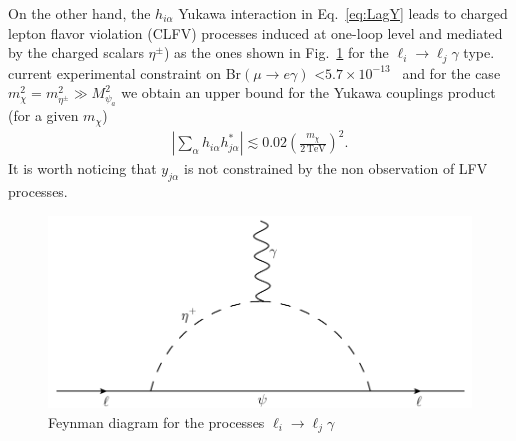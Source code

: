 \documentclass[12pt]{article}
\begin{document}
On the other hand, the $h_{i\alpha}$ Yukawa interaction in Eq.~\eqref{eq:LagY} leads to charged lepton flavor violation (CLFV) processes induced at one-loop level and mediated by the charged scalars $\eta^{\pm}$) as the ones shown in Fig.~\ref{fig:LFV} for the $\ell_i\to\ell_j\gamma$ type. 
current experimental constraint on Br$(\mu \to e\gamma)$ \textless $5.7 \times 10^{-13} $~\cite{Adam:2013mnn} and for the case $m_\chi^2=m_{\eta^{\pm}}^{2} \gg M_{\psi_{a}}^{2}$
 we obtain an upper bound for the Yukawa couplings product (for a given $m_\chi$)
\begin{align}
    \left| \sum_{\alpha}h_{i \alpha} h_{j\alpha}^{*} \right| \lesssim 0.02 \left(\frac{m_\chi}{2\,\text{TeV}} \right)^{2}.
\end{align}
It is worth noticing that $y_{j\alpha}$ is not constrained by the non observation of LFV processes. 

%
\begin{figure}[t]
\centering
\includegraphics[scale=0.6]{LFV.pdf}
\caption{Feynman diagram for the processes $\ell_{i} \to \ell_{j} \gamma$}
\label{fig:LFV}
\end{figure}
%


%

%
%
%
%
%
%
\end{document}
